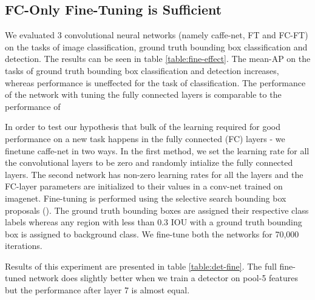 \documentclass[runningheads]{llncs}
\begin{document}
\subsection{FC-Only Fine-Tuning is Sufficient}
We evaluated 3 convolutional neural networks (namely caffe-net, FT and FC-FT) on the tasks of image classification, ground truth bounding box classification and detection. The results can be seen in table \ref{table:fine-effect}. The mean-AP on the tasks of ground truth bounding box classification and detection increases, whereas performance is uneffected for the task of classification. The performance of the network with tuning the fully connected layers is comparable to the performance of


In order to test our hypothesis that bulk of the learning required for good performance on a new task happens in the fully connected (FC) layers - we finetune caffe-net in two ways. In the first method, we set the learning rate for all the convolutional layers to be zero and randomly intialize the fully connected layers. The second network has non-zero learning rates for all the layers and the FC-layer parameters are initialized to their values in a conv-net trained on imagenet. Fine-tuning is performed  using the selective search bounding box proposals (\cite{rcnn}). The ground truth bounding boxes are assigned their respective class labels whereas any region with less than 0.3 IOU with a ground truth bounding box is assigned to background class. We fine-tune both the networks for 70,000 iterations.

Results of this experiment are presented in table \ref{table:det-fine}. The full fine-tuned network does slightly better when we train a detector on pool-5 features but the performance after layer 7 is almost equal. 
\end{document}
